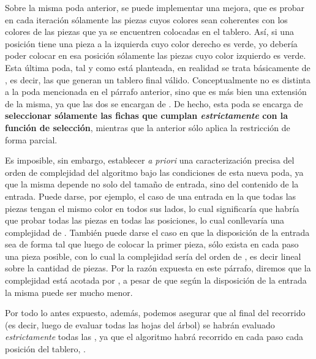 \documentclass[11pt, a4paper, twoside]{article}
\begin{document}
Sobre la misma poda anterior, se puede implementar una mejora, que es probar en cada iteración sólamente las piezas cuyos colores sean coherentes con los colores de las piezas que ya se encuentren colocadas en el tablero. Así, si una posición tiene una pieza a la izquierda cuyo color derecho es verde, yo debería poder colocar en esa posición sólamente las piezas cuyo color izquierdo es verde. Esta última poda, tal y como está planteada, en realidad se trata básicamente de \textbf{}, es decir, las que generan un tablero final válido. Conceptualmente no es distinta a la poda mencionada en el párrafo anterior, sino que es más bien una extensión de la misma, ya que las dos se encargan de . De hecho, esta poda se encarga de \textbf{seleccionar sólamente las fichas que cumplan \emph{estrictamente} con la función de selección}, mientras que la anterior sólo aplica la restricción de forma parcial. 

Es imposible, sin embargo, establecer \emph{a priori} una caracterización precisa del orden de complejidad del algoritmo bajo las condiciones de esta nueva poda, ya que la misma depende no solo del tamaño de entrada, sino del contenido de la entrada. Puede darse, por ejemplo, el caso de una entrada en la que todas las piezas tengan el mismo color en todos sus lados, lo cual significaría que habría que probar todas las piezas en todas las posiciones, lo cual conllevaría una complejidad de . También puede darse el caso en que la disposición de la entrada sea de forma tal que luego de colocar la primer pieza, sólo exista en cada paso una pieza posible, con lo cual la complejidad sería del orden de , es decir  lineal sobre la cantidad de piezas. Por la razón expuesta en este párrafo, diremos que la complejidad está acotada por , a pesar de que según la disposición de la entrada la misma puede ser mucho menor.

Por todo lo antes expuesto, además, podemos asegurar que al final del recorrido (es decir, luego de evaluar todas las hojas del árbol) se habrán evaluado \emph{estrictamente} todas las \textbf{}, ya que el algoritmo habrá recorrido en cada paso cada posición del tablero, \textbf{}.

\end{document}
